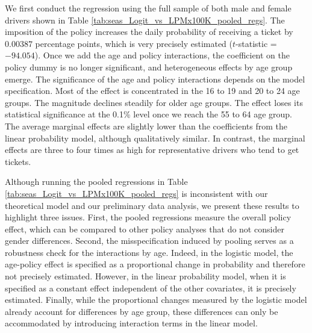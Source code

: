 We first conduct the regression using the full sample
of both male and female drivers
shown in 
% 
Table \ref{tab:seas_Logit_vs_LPMx100K_pooled_regs}.
% 
The imposition of the policy increases the daily probability 
of receiving a ticket by $0.00387$ percentage points, 
which is very precisely estimated ($t$-statistic = $-94.054$). 
Once we add the age and policy interactions, 
the coefficient on the policy dummy is no longer significant, 
and heterogeneous effects by age group emerge. 
% 
The significance of the age and policy interactions
depends on the model specification. 
% 
Most of the effect is concentrated in the 16 to 19 and 20 to 24 age groups. The magnitude declines steadily for older age groups. 
The effect loses its statistical significance at the 0.1\% level once we reach the 55 to 64 age group.
% 
The average marginal effects are slightly lower than the coefficients 
from the linear probability model, although qualitatively similar. 
In contrast, the marginal effects are three to four times as high
for representative drivers who tend to get tickets. 

Although running the pooled regressions in 
Table \ref{tab:seas_Logit_vs_LPMx100K_pooled_regs}
is inconsistent with our theoretical model and our preliminary data analysis, 
we present these results to highlight three issues. 
% 
First, the pooled regressions measure the overall policy effect, 
which can be compared to other policy analyses that do not
consider gender differences. 
% 
Second, the misspecification induced by pooling serves as a robustness check for the interactions by age. Indeed, in the logistic model, the age-policy effect is specified as a proportional change in probability and therefore not precisely estimated. However, in the linear probability model, when it is specified as a constant effect independent of the other covariates, it is precisely estimated.
%
Finally, while the proportional changes measured by the logistic model already account for differences by age group, these differences can only be accommodated by introducing interaction terms in the linear model.

